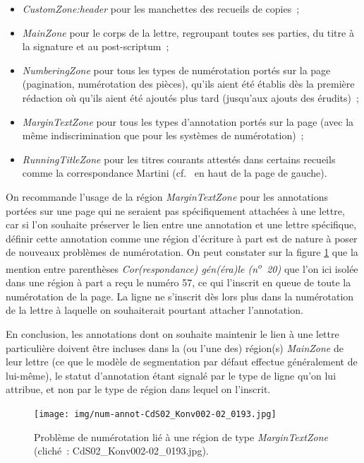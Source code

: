 \documentclass[a4paper,12pt,twoside]{book}
\begin{document}
				\begin{itemize}
					\item \textit{CustomZone:header} pour les manchettes des recueils de copies~;
					\item \textit{MainZone} pour le corps de la lettre, regroupant toutes ses parties, du titre à la signature et au post-scriptum~;
					\item \textit{NumberingZone} pour tous les types de numérotation portés sur la page (pagination, numérotation des pièces), qu'ils aient été établis dès la première rédaction où qu'ils aient été ajoutés plus tard (jusqu'aux ajouts des érudits)~;
					\item \textit{MarginTextZone} pour tous les types d'annotation portés sur la page (avec la même indiscrimination que pour les systèmes de numérotation)~;
					\item \textit{RunningTitleZone} pour les titres courants attestés dans certains recueils comme la correspondance Martini (cf.~\cite{CdS19054056} en haut de la page de gauche).
				\end{itemize}
				
				On recommande l'usage de la région \textit{MarginTextZone} pour les annotations portées sur une page qui ne seraient pas spécifiquement attachées à une lettre, car si l'on souhaite préserver le lien entre une annotation et une lettre spécifique, définir cette annotation comme une région d'écriture à part est de nature à poser de nouveaux problèmes de numérotation. On peut constater sur la figure \ref{num-annot-193} que la mention entre parenthèses \textit{Cor(respondance) gén(éra)le (n\textsuperscript{o}~20)} que l'on ici isolée dans une région à part a reçu le numéro 57, ce qui l'inscrit en queue de toute la numérotation de la page. La ligne ne s'inscrit dès lors plus dans la numérotation de la lettre à laquelle on souhaiterait pourtant attacher l'annotation.
				
				En conclusion, les annotations dont on souhaite maintenir le lien à une lettre particulière doivent être incluses dans la (ou l'une des) région(s) \textit{MainZone} de leur lettre (ce que le modèle de {segmentation} par défaut effectue généralement de lui-même), le statut d'annotation étant signalé par le type de ligne qu'on lui attribue, et non par le type de région dans lequel on l'inscrit.
				
				\begin{figure}[!h]
					\centering
					\texttt{[image: img/num-annot-CdS02\_Konv002-02\_0193.jpg]}
					\caption{Problème de numérotation lié à une région de type \textit{MarginTextZone} (cliché~: CdS02\_Konv002-02\_0193.jpg).}
					\label{num-annot-193}
				\end{figure}
				
\end{document}
